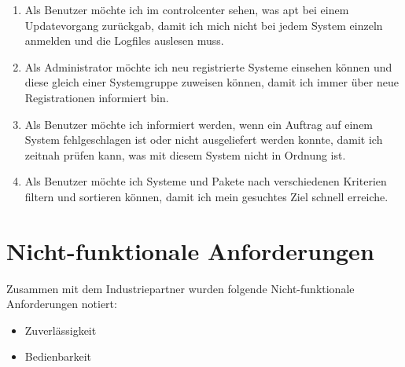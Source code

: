 \begin{enumerate}
    \item Als Benutzer möchte ich im \gls{controlcenter} sehen, was \gls{apt} bei einem Updatevorgang zurückgab, damit ich mich nicht bei jedem System einzeln anmelden und die Logfiles auslesen muss.
    \item Als Administrator möchte ich neu registrierte Systeme einsehen können und diese gleich einer Systemgruppe zuweisen können, damit ich immer über neue Registrationen informiert bin.
    \item Als Benutzer möchte ich informiert werden, wenn ein Auftrag auf einem System fehlgeschlagen ist oder nicht ausgeliefert werden konnte, damit ich zeitnah prüfen kann, was mit diesem System nicht in Ordnung ist.
    \item Als Benutzer möchte ich Systeme und Pakete nach verschiedenen Kriterien filtern und sortieren können, damit ich mein gesuchtes Ziel schnell erreiche.
\end{enumerate}


\section{Nicht-funktionale Anforderungen}


Zusammen mit dem Industriepartner wurden folgende Nicht-funktionale Anforderungen notiert:

\begin{itemize}
\item Zuverlässigkeit
\item Bedienbarkeit
\end{itemize}